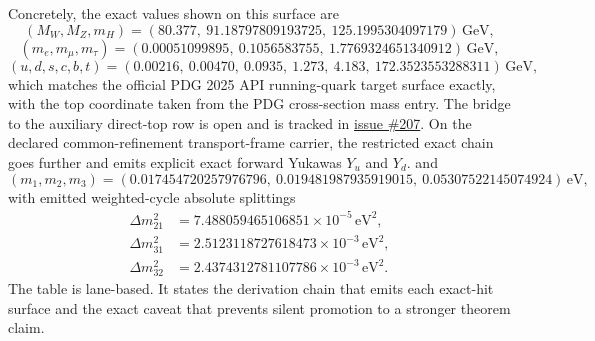 \documentclass[11pt]{article}
\begin{document}
Concretely, the exact values shown on this surface are
\[
(M_W,M_Z,m_H)=
(80.377,\ 91.18797809193725,\ 125.1995304097179)\,\mathrm{GeV},
\]
\[
(m_e,m_\mu,m_\tau)=
(0.00051099895,\ 0.1056583755,\ 1.7769324651340912)\,\mathrm{GeV},
\]
\[
(u,d,s,c,b,t)=
(0.00216,\ 0.00470,\ 0.0935,\ 1.273,\ 4.183,\ 172.3523553288311)\,\mathrm{GeV},
\]
which matches the official PDG 2025 API running-quark target surface exactly, with the top coordinate taken from the PDG cross-section mass entry. The bridge to the auxiliary direct-top row is open and is tracked in \href{https://github.com/FloatingPragma/observer-patch-holography/issues/207}{issue \#207}. On the declared common-refinement transport-frame carrier, the restricted exact chain goes further and emits explicit exact forward Yukawas \(Y_u\) and \(Y_d\).
and
\[
(m_1,m_2,m_3)=
(0.017454720257976796,\ 0.019481987935919015,\ 0.05307522145074924)\,\mathrm{eV},
\]
with emitted weighted-cycle absolute splittings
\[
\begin{aligned}
\Delta m_{21}^2&=7.488059465106851\times10^{-5}\,\mathrm{eV}^2,\\
\Delta m_{31}^2&=2.5123118727618473\times10^{-3}\,\mathrm{eV}^2,\\
\Delta m_{32}^2&=2.4374312781107786\times10^{-3}\,\mathrm{eV}^2.
\end{aligned}
\]
The table is lane-based. It states the derivation chain that emits each exact-hit surface and the exact caveat that prevents silent promotion to a stronger theorem claim.
\end{document}

